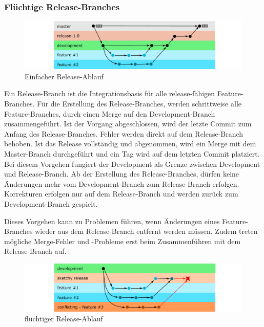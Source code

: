 \subsubsection{Flüchtige Release-Branches}
\label{temporary-releases}

\begin{figure}[htbp]
  \includegraphics[width=\textwidth, height=\textheight, keepaspectratio]
  {resources/simple-release.pdf}
  \caption{Einfacher Release-Ablauf}
  \label{simple-release}
\end{figure}

Ein Release-Branch ist die Integrationsbasis für alle release-fähigen Feature-Branches. Für die Erstellung des Release-Branches, werden schrittweise alle Feature-Branches, durch einen Merge auf den Development-Branch zusammengeführt. Ist der Vorgang abgeschlossen, wird der letzte Commit zum Anfang des Release-Branches. Fehler werden direkt auf dem Release-Branch behoben. Ist das Release vollständig und abgenommen, wird ein Merge mit dem Master-Branch durchgeführt und ein Tag wird auf dem letzten Commit platziert. Bei diesem Vorgehen fungiert der Development als Grenze zwischen Development und Release-Branch. Ab der Erstellung des Release-Branches, dürfen keine Änderungen mehr vom Development-Branch zum Release-Branch erfolgen. Korrekturen erfolgen nur auf dem Release-Branch und werden zurück zum Development-Branch gespielt.

Dieses Vorgehen kann zu Problemen führen, wenn Änderungen eines Feature-Branches wieder aus dem Release-Branch entfernt werden müssen. Zudem treten mögliche Merge\hyp{}Fehler und \hyp{}Probleme erst beim Zusammenführen mit dem Release-Branch auf.

\begin{figure}[htbp]
  \includegraphics[width=\textwidth, height=\textheight, keepaspectratio]
  {resources/sketchy-release.pdf}
  \caption{flüchtiger Release-Ablauf}
  \label{sketchy-release}
\end{figure}

